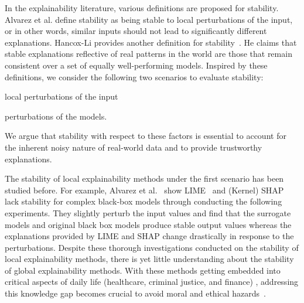 In the explainability literature, various definitions are proposed for stability. Alvarez et al. \cite{alvarez2018robustness} define stability as being stable to local perturbations of the input, or in other words, similar inputs should not lead to significantly different explanations. Hancox-Li provides another definition for stability~\cite{hancox2020robustness}. He claims that stable explanations reflective of real patterns in the world are those that remain consistent over a set of equally well-performing models. Inspired by these definitions, we consider the following two scenarios to evaluate stability:  
\begin{enumerate*}
    \item local perturbations of the input
    \item perturbations of the models.
\end{enumerate*} 
We argue that stability with respect to these factors is essential to account for the inherent noisy nature of real-world data and to provide trustworthy explanations.

The stability of local explainability methods under the first scenario has been studied before. For example, Alvarez et al.~\cite{alvarez2018robustness} show LIME~\cite{ribeiro2016should} and (Kernel) SHAP~\cite{NIPS2017_7062} lack stability for complex black-box models through conducting the following experiments. They slightly perturb the input values and find that the surrogate models and original black box models produce stable output values whereas the explanations provided by LIME and SHAP change drastically in response to the perturbations. Despite these thorough investigations conducted on the stability of local explainability methods, there is yet little understanding about the stability of global explainability methods. With these methods getting embedded into critical aspects of daily life (healthcare, criminal justice, and finance)%
, addressing this knowledge gap becomes crucial to avoid moral and ethical hazards~\cite{rudin2019stop}.

